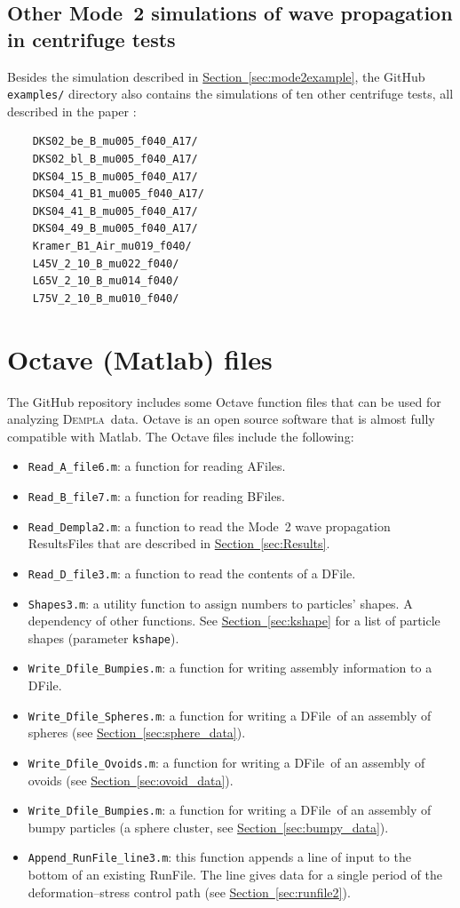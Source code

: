 \documentclass[letterpaper,11pt]{article}
\newcommand{\Dempla}{\textsc{Dempla}}
\newcommand{\AFile}{\textsf{AFile}}
\newcommand{\BFile}{\textsf{BFile}}
\newcommand{\DFile}{\textsf{DFile}}
\newcommand{\ResultsFile}{\textsf{ResultsFile}}
\begin{document}
\subsection{Other Mode~2 simulations of wave propagation in centrifuge tests}\label{sec:othermode2}
Besides the simulation described in
\hyperref[sec:mode2example]{Section~\ref*{sec:mode2example}},
the GitHub \texttt{examples/}
directory also contains the simulations of ten other
centrifuge tests, all described in the paper
\cite{Kuhn:2021a}:
\begin{verbatim}
	DKS02_be_B_mu005_f040_A17/
	DKS02_bl_B_mu005_f040_A17/
	DKS04_15_B_mu005_f040_A17/
	DKS04_41_B1_mu005_f040_A17/
	DKS04_41_B_mu005_f040_A17/
	DKS04_49_B_mu005_f040_A17/
	Kramer_B1_Air_mu019_f040/
	L45V_2_10_B_mu022_f040/
	L65V_2_10_B_mu014_f040/
	L75V_2_10_B_mu010_f040/
\end{verbatim}
%
\section{Octave (Matlab) files}
The GitHub repository includes some Octave function files
that can be used for analyzing \Dempla\ data.
Octave is an open source software that is almost
fully compatible with Matlab.
The Octave files include the following:
%
\begin{itemize}
\item
\texttt{Read\_A\_file6.m}:
a function for reading \AFile s.
\item
\texttt{Read\_B\_file7.m}:
a function for reading \BFile s.
\item
\texttt{Read\_Dempla2.m}:
a function to read the Mode~2
wave propagation \ResultsFile s that are described
in \hyperref[sec:Results]{Section~\ref*{sec:Results}}.
\item
\texttt{Read\_D\_file3.m}:
a function to read the contents of a \DFile.
\item
\texttt{Shapes3.m}: a utility function to assign numbers to
particles' shapes.
A dependency of other functions.
See \hyperref[sec:kshape]{Section~\ref*{sec:kshape}}
for a list of particle shapes (parameter \texttt{kshape}).
\item
\texttt{Write\_Dfile\_Bumpies.m}: a function for writing
assembly information to a \DFile.
\item
\texttt{Write\_Dfile\_Spheres.m}: a function for writing
a \DFile\ of an assembly of spheres
(see \hyperref[sec:sphere_data]{Section~\ref*{sec:sphere_data}}).
\item
\texttt{Write\_Dfile\_Ovoids.m}: a function for writing
a \DFile\ of an assembly of ovoids
(see \hyperref[sec:ovoid_data]{Section~\ref*{sec:ovoid_data}}).
\item
\texttt{Write\_Dfile\_Bumpies.m}: a function for writing
a \DFile\ of an assembly of bumpy particles
(a sphere cluster,
see \hyperref[sec:bumpy_data]{Section~\ref*{sec:bumpy_data}}).
\item
\texttt{Append\_RunFile\_line3.m}:
this function appends a line
of input to the bottom of an existing RunFile.
The line gives data 
for a single period of the deformation--stress control path
(see \hyperref[sec:runfile2]{Section~\ref*{sec:runfile2}}).
\end{itemize}
%
%
%
\end{document}
